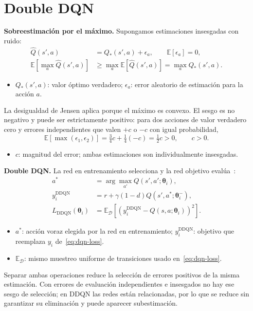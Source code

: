 \section{Double DQN}

\textbf{Sobreestimación por el máximo.} Supongamos estimaciones insesgadas con ruido:
\begin{equation}\label{eq:max-bias}
\begin{aligned}
    \hat Q(s',a)&=Q_*(s',a)+\epsilon_a,\qquad\mathbb{E}[\epsilon_a]=0,\\
    \mathbb{E}\left[\max_a\hat Q(s',a)\right]
    &\geq\max_a\mathbb{E}[\hat Q(s',a)]
    =\max_a Q_*(s',a).
\end{aligned}
\end{equation}
\begin{itemize}
    \item $Q_*(s',a)$: valor óptimo verdadero; $\epsilon_a$: error aleatorio de estimación para la acción $a$.
\end{itemize}
La desigualdad de Jensen aplica porque el máximo es convexo. El sesgo es no negativo y puede ser estrictamente positivo: para dos acciones de valor verdadero cero y errores independientes que valen $+c$ o $-c$ con igual probabilidad,
\begin{equation}\label{eq:max-bias-example}
    \mathbb{E}[\max(\epsilon_1,\epsilon_2)]
    =\tfrac34c+\tfrac14(-c)=\tfrac12c>0,\qquad c>0.
\end{equation}
\begin{itemize}
    \item $c$: magnitud del error; ambas estimaciones son individualmente insesgadas.
\end{itemize}

\textbf{Double DQN.} La red en entrenamiento selecciona y la red objetivo evalúa~\cite{vanhasselt2016}:
\begin{equation}\label{eq:double-dqn}
\begin{aligned}
    a^*&=\arg\max_{a'}Q(s',a';\boldsymbol{\theta}_i),\\
    y_i^{\mathrm{DDQN}}&=r+\gamma(1-d)Q(s',a^*;\boldsymbol{\theta}_i^{-}),\\
    L_{\mathrm{DDQN}}(\boldsymbol{\theta}_i)&=
    \mathbb{E}_{\mathcal{D}}[(y_i^{\mathrm{DDQN}}-Q(s,a;\boldsymbol{\theta}_i))^2].
\end{aligned}
\end{equation}
\begin{itemize}
    \item $a^*$: acción voraz elegida por la red en entrenamiento; $y_i^{\mathrm{DDQN}}$: objetivo que reemplaza $y_i$ de~\eqref{eq:dqn-loss}.
    \item $\mathbb{E}_{\mathcal{D}}$: mismo muestreo uniforme de transiciones usado en~\eqref{eq:dqn-loss}.
\end{itemize}
Separar ambas operaciones reduce la selección de errores positivos de la misma estimación. Con errores de evaluación independientes e insesgados no hay ese sesgo de selección; en DDQN las redes están relacionadas, por lo que se reduce sin garantizar su eliminación y puede aparecer subestimación.
